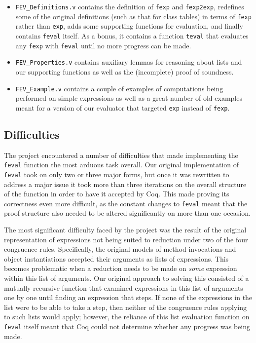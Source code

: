 \documentclass{article}
\begin{document}
\begin{itemize}
	\item \texttt{FEV\_Definitions.v} contains the definition of \texttt{fexp} and \texttt{fexp2exp}, redefines some of the original definitions (such as that for class tables) in terms of \texttt{fexp} rather than \texttt{exp}, adds some supporting functions for evaluation, and finally contains \texttt{feval} itself. As a bonus, it contains a function \texttt{teval} that evaluates any \texttt{fexp} with \texttt{feval} until no more progress can be made.
	
	\item \texttt{FEV\_Properties.v} contains auxiliary lemmas for reasoning about lists and our supporting functions as well as the (incomplete) proof of soundness.
	
	\item \texttt{FEV\_Example.v} contains a couple of examples of computations being performed on simple expressions as well as a great number of old examples meant for a version of our evaluator that targeted \texttt{exp} instead of \texttt{fexp}.
\end{itemize}

\subsection{Difficulties}

The project encountered a number of difficulties that made implementing the \texttt{feval} function the most arduous task overall. Our original implementation of \texttt{feval} took on only two or three major forms, but once it was rewritten to address a major issue it took more than three iterations on the overall structure of the function in order to have it accepted by Coq. This made proving its correctness even more difficult, as the constant changes to \texttt{feval} meant that the proof structure also needed to be altered significantly on more than one occasion.

The most significant difficulty faced by the project was the result of the original representation of expressions not being suited to reduction under two of the four congruence rules. Specifically, the original models of method invocations and object instantiations accepted their arguments as lists of expressions. This becomes problematic when a reduction needs to be made on \emph{some} expression within this list of arguments. Our original approach to solving this consisted of a mutually recursive function that examined expressions in this list of arguments one by one until finding an expression that steps. If none of the expressions in the list were to be able to take a step, then neither of the congruence rules applying to such lists would apply; however, the reliance of this list evaluation function on \texttt{feval} itself meant that Coq could not determine whether any progress was being made.
\end{document}
